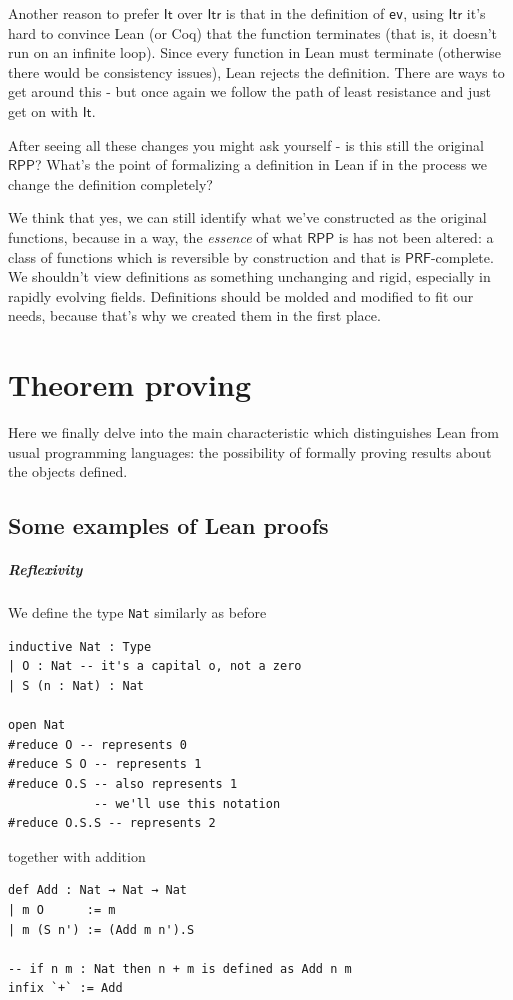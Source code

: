 \documentclass[oneside]{book}
\theoremstyle{definition}
\theoremstyle{remark}
\theoremstyle{plain}
\newcommand{\RPP}{\mathsf{RPP}}
\newcommand{\rppIt}{\mathsf{It}}
\newcommand{\rppItr}{\mathsf{Itr}}
\newcommand{\PRF}{\mathsf{PRF}}
\begin{document}
\begin{itemize}
Another reason to prefer $\rppIt$ over $\rppItr$ is that in the definition of \lstinline{ev},
using $\rppItr$ it's hard to convince Lean (or Coq) that the function terminates (that is, it doesn't run on an infinite loop).
Since every function in Lean must terminate (otherwise there would be consistency issues), Lean rejects the definition.
There are ways to get around this - but once again we follow the path of least resistance and just get on with $\rppIt$.
\end{itemize}

After seeing all these changes you might ask yourself - is this still the original $\RPP$?
What's the point of formalizing a definition in Lean if in the process we change the definition completely?

We think that yes, we can still identify what we've constructed as the original functions,
because in a way, the \textit{essence} of what $\RPP$ is has not been altered:
a class of functions which is reversible by construction and that is $\PRF$-complete.
We shouldn't view definitions as something unchanging and rigid, especially in rapidly evolving fields.
Definitions should be molded and modified to fit our needs,
because that's why we created them in the first place.


\chapter{Theorem proving}

Here we finally delve into the main characteristic which distinguishes Lean from usual programming languages:
the possibility of formally proving results about the objects defined.

\section{Some examples of Lean proofs}

\paragraph{Reflexivity}

We define the type \lstinline{Nat} similarly as before
\begin{lstlisting}
inductive Nat : Type
| O : Nat -- it's a capital o, not a zero
| S (n : Nat) : Nat

open Nat
#reduce O -- represents 0
#reduce S O -- represents 1
#reduce O.S -- also represents 1
            -- we'll use this notation
#reduce O.S.S -- represents 2

\end{lstlisting}
together with addition
\begin{lstlisting}
def Add : Nat → Nat → Nat
| m O      := m
| m (S n') := (Add m n').S  

-- if n m : Nat then n + m is defined as Add n m
infix `+` := Add
\end{lstlisting}
  
\end{document}
